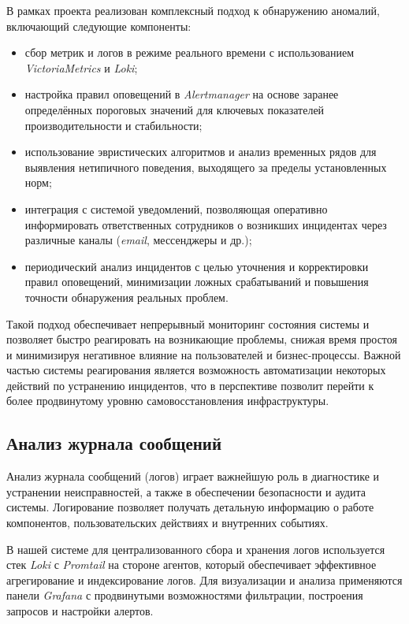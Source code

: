 В рамках проекта реализован комплексный подход к обнаружению аномалий, включающий следующие компоненты:

\begin{itemize}
    \item сбор метрик и логов в режиме реального времени с использованием \textit{VictoriaMetrics} и \textit{Loki};
    \item настройка правил оповещений в \textit{Alertmanager} на основе заранее определённых пороговых значений для ключевых показателей производительности и стабильности;
    \item использование эвристических алгоритмов и анализ временных рядов для выявления нетипичного поведения, выходящего за пределы установленных норм;
    \item интеграция с системой уведомлений, позволяющая оперативно информировать ответственных сотрудников о возникших инцидентах через различные каналы (\textit{email}, мессенджеры и др.);
    \item периодический анализ инцидентов с целью уточнения и корректировки правил оповещений, минимизации ложных срабатываний и повышения точности обнаружения реальных проблем.
\end{itemize}

Такой подход обеспечивает непрерывный мониторинг состояния системы и позволяет быстро реагировать на возникающие проблемы, снижая время простоя и минимизируя негативное влияние на пользователей и бизнес-процессы. Важной частью системы реагирования является возможность автоматизации некоторых действий по устранению инцидентов, что в перспективе позволит перейти к более продвинутому уровню самовосстановления инфраструктуры.

\subsection{Анализ журнала сообщений}

Анализ журнала сообщений (логов) играет важнейшую роль в диагностике и устранении неисправностей, а также в обеспечении безопасности и аудита системы. Логирование позволяет получать детальную информацию о работе компонентов, пользовательских действиях и внутренних событиях.

В нашей системе для централизованного сбора и хранения логов используется стек \textit{Loki} с \textit{Promtail} на стороне агентов, который обеспечивает эффективное агрегирование и индексирование логов. Для визуализации и анализа применяются панели \textit{Grafana} с продвинутыми возможностями фильтрации, построения запросов и настройки алертов.

